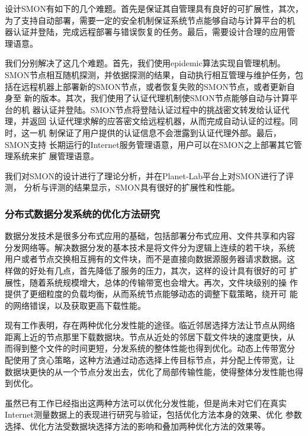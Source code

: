 设计SMON有如下的几个难题。首先是保证其自管理具有良好的可扩展性，其次，
为了支持自动部署，需要一定的安全机制保证系统节点能够自动与计算平台的机
器认证并登陆，完成远程部署与错误恢复的任务。最后，需要设计合理的应用管
理语意。

我们分别解决了这几个难题。首先，我们使用epidemic算法实现自管理机制。
SMON节点相互随机探测，并依据探测的结果，自动执行相互管理与维护任务，包
括在远程机器上部署新的SMON节点，或者恢复失败的SMON节点，或者更新自身至
新的版本。其次，我们使用了认证代理机制使SMON节点能够自动与计算平台的机
器认证并登陆。SMON节点将登陆认证过程中的挑战密文转发给认证代理，并返回
认证代理求解的应答密文给远程机器，从而完成自动认证的过程。同时，这一机
制保证了用户提供的认证信息不会泄露到认证代理外部。最后，SMON支持
长期运行的Internet服务管理语意，用户可以在SMON之上部署其它管理系统来扩
展管理语意。

我们对SMON的设计进行了理论分析，并在Planet-Lab平台上对SMON进行了评测，
分析与评测的结果显示，SMON具有很好的扩展性和性能。

\subsubsection*{分布式数据分发系统的优化方法研究}

数据分发技术是很多分布式应用的基础，包括部署分布式应用、文件共享和内容
分发网络等。解决数据分发的基本技术是将文件分为逻辑上连续的若干块，系统
用户或者节点交换相互拥有的文件块，而不是直接向数据源服务器请求数据。这
样做的好处有几点，首先降低了服务的压力，其次，这样的设计具有很好的可
扩展性，随着系统规模增大，总体的传输带宽也会增大。再次，文件块级别的操
作提供了更细粒度的负载均衡，从而系统节点能够动态的调整下载策略，绕开可
能的网络错误，以及获取更高下载性能。

现有工作表明，存在两种优化分发性能的途径。临近邻居选择方法让节点从网络
距离上近的节点那里下载数据块。节点从近处的邻居下载文件块的速度更快，从
而得到整个文件的时间更短，分发系统的整体性能也得到优化。动态上传带宽分
配使用了贪心策略，这种方法通过动态选择上传目标节点，并分配上传带宽，让
数据块更快的从一个节点分发出去，优化了局部传输性能，使得整体分发性能也得
到优化。

虽然已有工作已经指出这两种方法可以优化分发性能，但是尚未对它们在真实
Internet测量数据上的表现进行研究与验证，包括优化方法本身的效果、优化
参数选择、优化方法受数据块选择方法的影响和叠加两种优化方法的效果等。


